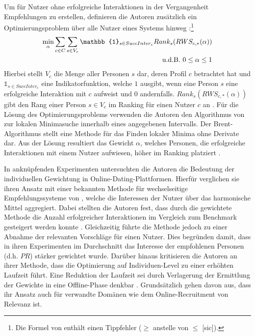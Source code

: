 Um für Nutzer ohne erfolgreiche Interaktionen in der Vergangenheit Empfehlungen zu erstellen, definieren die Autoren zusätzlich ein Optimierungsproblem über alle Nutzer eines Systems hinweg \cite[S. 135]{kleinerman:2:inproceedings}:\footnote{Die Formel von \textcite[S. 135]{kleinerman:2:inproceedings} enthält einen Tippfehler ($\geq$ anstelle von $\leq$ [sic]).}
\begin{equation}\label{eq37}
    \begin{aligned}
        \min_{\alpha} \sum_{c \in C} \sum_{s \in V_{c}} \mathbb{1}_{s \in SuccInter_{c}} Rank_{s} (RWS_{c,*}(\alpha))\\
        \textnormal{u.d.B. } 0 \leq \alpha \leq 1\\
    \end{aligned}
\end{equation}
Hierbei stellt $V_{c}$ die Menge aller Personen $s$ dar, deren Profil $c$ betrachtet hat und $\mathbb{1}_{s \in SuccInter_{c}}$ eine Indikatorfunktion, welche $1$ ausgibt, wenn eine Person $s$ eine erfolgreiche Interaktion mit $c$ aufweist und $0$ andernfalls.
$Rank_{s} (RWS_{c,*}(\alpha))$ gibt den Rang einer Person $s \in V_{c}$ im Ranking für einen Nutzer $c$ an \cite[S. 135]{kleinerman:2:inproceedings}.
Für die Lösung des Optimierungsproblems verwenden die Autoren den Algorithmus von \textcite[S. 422ff.]{brent:article} zur lokalen Minimasuche innerhalb eines angegebenen Intervalls.
Der Brent-Algorithmus stellt eine Methode für das Finden lokaler Minima ohne Derivate dar.
Aus der Lösung resultiert das Gewicht $\alpha$, welches Personen, die erfolgreiche Interaktionen mit einem Nutzer aufwiesen, höher im Ranking platziert \cite[S. 135]{kleinerman:2:inproceedings}.

In anknüpfenden Experimenten untersuchten die Autoren die Bedeutung der individuellen Gewichtung in Online-Dating-Plattformen.
Hierfür verglichen sie ihren Ansatz mit einer bekannten Methode für wechselseitige Empfehlungssysteme von \textcite[S. 6]{xia:inproceedings}, welche die Interessen der Nutzer über das harmonische Mittel aggregiert.
Dabei stellten die Autoren fest, dass durch die gewichtete Methode die Anzahl erfolgreicher Interaktionen im Vergleich zum Benchmark gesteigert werden konnte \cite[S. 132]{kleinerman:2:inproceedings}.
Gleichzeitig führte die Methode jedoch zu einer Abnahme der relevanten Vorschläge für einen Nutzer.
Dies begründen \textcite[S. 132]{kleinerman:2:inproceedings} damit, dass in ihren Experimenten im Durchschnitt das Interesse der empfohlenen Personen (d.h. $PR$) stärker gewichtet wurde.
Darüber hinaus kritisieren die Autoren an ihrer Methode, dass die Optimierung auf Individuen-Level zu einer erhöhten Laufzeit führt.
Eine Reduktion der Laufzeit sei durch Verlagerung der Ermittlung der Gewichte in eine Offline-Phase denkbar \cite[S. 138]{kleinerman:2:inproceedings}.
Grundsätzlich gehen  \textcite[S. 138]{kleinerman:2:inproceedings} davon aus, dass ihr Ansatz auch für verwandte Domänen wie dem Online-Recruitment von Relevanz ist.

